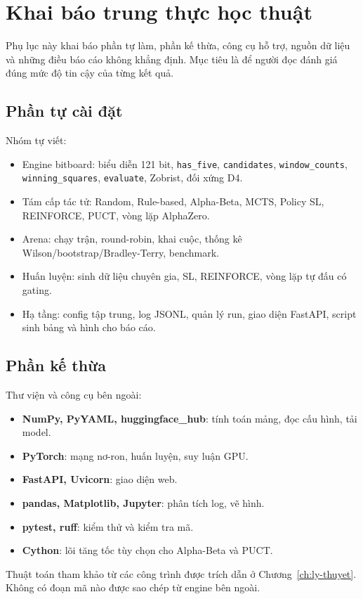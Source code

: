\chapter{Khai báo trung thực học thuật}
\label{app:trung-thuc}

Phụ lục này khai báo phần tự làm, phần kế thừa, công cụ hỗ trợ, nguồn dữ liệu và những điều
báo cáo không khẳng định. Mục tiêu là để người đọc đánh giá đúng mức độ tin cậy của từng kết
quả.

\section{Phần tự cài đặt}
Nhóm tự viết:
\begin{itemize}
  \item Engine bitboard: biểu diễn 121 bit, \texttt{has\_five}, \texttt{candidates},
        \texttt{window\_counts}, \texttt{winning\_squares}, \texttt{evaluate}, Zobrist, đối
        xứng D4.
  \item Tám cấp tác tử: Random, Rule-based, Alpha-Beta, MCTS, Policy SL, REINFORCE, PUCT,
        vòng lặp AlphaZero.
  \item Arena: chạy trận, round-robin, khai cuộc, thống kê Wilson/bootstrap/Bradley-Terry,
        benchmark.
  \item Huấn luyện: sinh dữ liệu chuyên gia, SL, REINFORCE, vòng lặp tự đấu có gating.
  \item Hạ tầng: config tập trung, log JSONL, quản lý run, giao diện FastAPI, script sinh bảng
        và hình cho báo cáo.
\end{itemize}

\section{Phần kế thừa}
Thư viện và công cụ bên ngoài:
\begin{itemize}
  \item \textbf{NumPy, PyYAML, huggingface\_hub}: tính toán mảng, đọc cấu hình, tải model.
  \item \textbf{PyTorch}: mạng nơ-ron, huấn luyện, suy luận GPU.
  \item \textbf{FastAPI, Uvicorn}: giao diện web.
  \item \textbf{pandas, Matplotlib, Jupyter}: phân tích log, vẽ hình.
  \item \textbf{pytest, ruff}: kiểm thử và kiểm tra mã.
  \item \textbf{Cython}: lõi tăng tốc tùy chọn cho Alpha-Beta và PUCT.
\end{itemize}
Thuật toán tham khảo từ các công trình được trích dẫn ở Chương~\ref{ch:ly-thuyet}. Không có
đoạn mã nào được sao chép từ engine bên ngoài.


